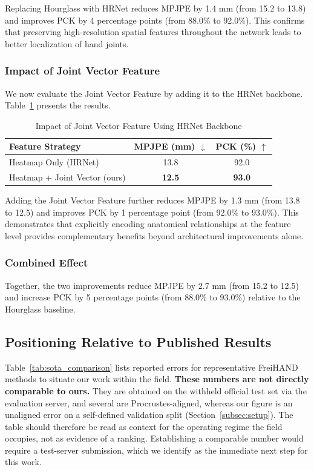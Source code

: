 Replacing Hourglass with HRNet reduces MPJPE by 1.4 mm (from 15.2 to 13.8) and improves PCK by 4 percentage points (from 88.0\% to 92.0\%). This confirms that preserving high-resolution spatial features throughout the network leads to better localization of hand joints.

\subsubsection{Impact of Joint Vector Feature}
We now evaluate the Joint Vector Feature by adding it to the HRNet backbone. Table~\ref{tab:vector_comparison} presents the results.

\begin{table}[ht]
\centering
\caption{Impact of Joint Vector Feature Using HRNet Backbone}
\label{tab:vector_comparison}
\begin{tabular}{lcc}
\toprule
\textbf{Feature Strategy} & \textbf{MPJPE (mm)} $\downarrow$ & \textbf{PCK (\%)} $\uparrow$ \\
\midrule
Heatmap Only (HRNet)          & 13.8 & 92.0 \\
Heatmap + Joint Vector (ours) & \textbf{12.5} & \textbf{93.0} \\
\bottomrule
\end{tabular}
\end{table}

Adding the Joint Vector Feature further reduces MPJPE by 1.3 mm (from 13.8 to 12.5) and improves PCK by 1 percentage point (from 92.0\% to 93.0\%). This demonstrates that explicitly encoding anatomical relationships at the feature level provides complementary benefits beyond architectural improvements alone.

\subsubsection{Combined Effect}
Together, the two improvements reduce MPJPE by 2.7 mm (from 15.2 to 12.5) and increase PCK by 5 percentage points (from 88.0\% to 93.0\%) relative to the Hourglass baseline.

\subsection{Positioning Relative to Published Results}
\label{subsec:sota_comparison}
Table~\ref{tab:sota_comparison} lists reported errors for representative FreiHAND methods to situate our work within the field. \textbf{These numbers are not directly comparable to ours.} They are obtained on the withheld official test set via the evaluation server, and several are Procrustes-aligned, whereas our figure is an unaligned error on a self-defined validation split (Section~\ref{subsec:setup}). The table should therefore be read as context for the operating regime the field occupies, not as evidence of a ranking. Establishing a comparable number would require a test-server submission, which we identify as the immediate next step for this work.

